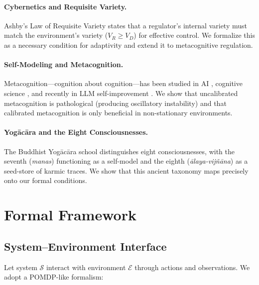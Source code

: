 \documentclass[11pt,a4paper]{article}
\begin{document}
\paragraph{Cybernetics and Requisite Variety.}
Ashby's Law of Requisite Variety \citep{ashby1956introduction} states that a regulator's internal variety must match the environment's variety ($V_R \geq V_D$) for effective control. We formalize this as a necessary condition for adaptivity and extend it to metacognitive regulation.

\paragraph{Self-Modeling and Metacognition.}
Metacognition---cognition about cognition---has been studied in AI \citep{cox2005metacognition}, cognitive science \citep{flavell1979metacognition}, and recently in LLM self-improvement \citep{puppyone2025self}. We show that uncalibrated metacognition is pathological (producing oscillatory instability) and that calibrated metacognition is only beneficial in non-stationary environments.

\paragraph{Yog\={a}c\={a}ra and the Eight Consciousnesses.}
The Buddhist Yog\={a}c\={a}ra school \citep{vasubandhu1958} distinguishes eight consciousnesses, with the seventh (\emph{manas}) functioning as a self-model and the eighth (\emph{\={a}laya-vij\~{n}\={a}na}) as a seed-store of karmic traces. We show that this ancient taxonomy maps precisely onto our formal conditions.

\section{Formal Framework}

\subsection{System--Environment Interface}

Let system $\mathcal{S}$ interact with environment $\mathcal{E}$ through actions and observations. We adopt a POMDP-like formalism:
\end{document}
